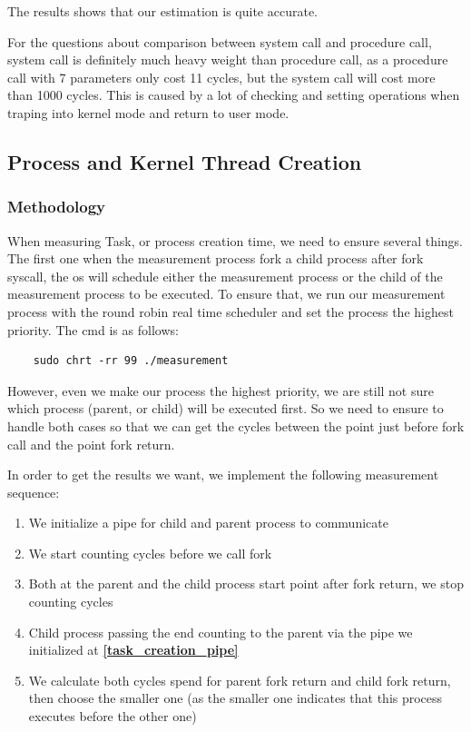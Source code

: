 The results shows that our estimation is quite accurate.

For the questions about comparison between system call and procedure call, system call is definitely much heavy weight than procedure call, as a procedure call with 7 parameters only cost 11 cycles, but the system call will cost more than 1000 cycles. This is caused by a lot of checking and setting operations when traping into kernel mode and return to user mode.

\subsection{Process and Kernel Thread Creation}

\subsubsection{Methodology}
\label {creation_methodology}

When measuring Task, or process creation time, we need to ensure several things. The first one when the measurement process fork a child process after fork syscall, the os will schedule either the measurement process or the child of the measurement process to be executed. To ensure that, we run our measurement process with the round robin real time scheduler and set the process the highest priority. The cmd is as follows:

\begin{lstlisting}
    sudo chrt -rr 99 ./measurement
\end{lstlisting}

However, even we make our process the highest priority,  we are still not sure which process (parent, or child) will be executed first. So we need to ensure to handle both cases so that we can get the cycles between the point just before fork call and the point fork return.

In order to get the results we want, we implement the following measurement sequence:

\begin{enumerate}
    \item We initialize a pipe for child and parent process to communicate \label{task_creation_pipe}
    \item We start counting cycles before we call fork
    \item Both at the parent and the child process start point after fork return, we stop counting cycles
    \item Child process passing the end counting to the parent via the pipe we initialized at \textbf{\ref{task_creation_pipe}}
    \item We calculate both cycles spend for parent fork return and child fork return, then choose the smaller one (as the smaller one indicates that this process executes before the other one)
\end{enumerate}

